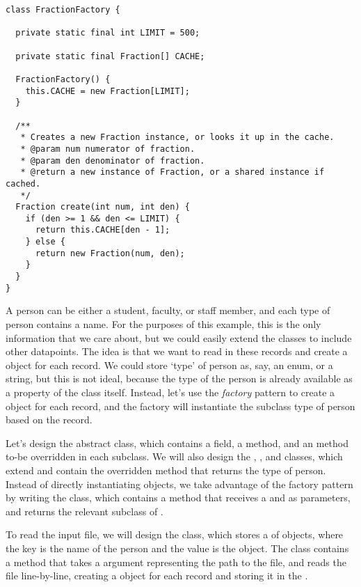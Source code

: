 \enlargethispage{-4\baselineskip}
\begin{lstlisting}[language=MyJava]
class FractionFactory {

  private static final int LIMIT = 500;
  
  private static final Fraction[] CACHE;

  FractionFactory() {
    this.CACHE = new Fraction[LIMIT];
  }

  /**
   * Creates a new Fraction instance, or looks it up in the cache.
   * @param num numerator of fraction.
   * @param den denominator of fraction.
   * @return a new instance of Fraction, or a shared instance if cached.
   */
  Fraction create(int num, int den) {
    if (den >= 1 && den <= LIMIT) {
      return this.CACHE[den - 1];
    } else {
      return new Fraction(num, den);
    }
  }
}
\end{lstlisting}

A person can be either a student, faculty, or staff member, and each type of person contains a name. 
For the purposes of this example, this is the only information that we care about, but we could easily extend the classes to include other datapoints. 
The idea is that we want to read in these records and create a  object for each record. 
We could store `type' of person as, say, an enum, or a string, but this is not ideal, because the type of the person is already available as a property of the class itself. 
Instead, let's use the \emph{factory} pattern to create a  object for each record, and the factory will instantiate the subclass type of person based on the record.

Let's design the abstract  class, which contains a  field, a  method, and an   method to-be overridden in each subclass. 
We will also design the , , and  classes, which extend  and contain the overridden  method that returns the type of person. 
Instead of directly instantiating  objects, we take advantage of the factory pattern by writing the  class, which contains a  method that receives a  and  as parameters, and returns the relevant subclass of .

To read the input file, we will design the  class, which stores a  of  objects, where the key is the name of the person and the value is the  object. 
The  class contains a  method that takes a  argument representing the path to the file, and reads the file line-by-line, creating a  object for each record and storing it in the .

